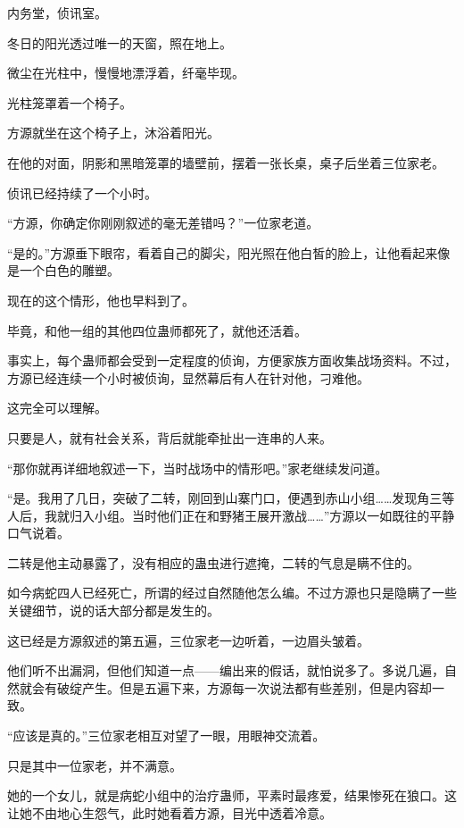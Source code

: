 
\begin{this_body}



内务堂，侦讯室。

冬日的阳光透过唯一的天窗，照在地上。

微尘在光柱中，慢慢地漂浮着，纤毫毕现。

光柱笼罩着一个椅子。

方源就坐在这个椅子上，沐浴着阳光。

在他的对面，阴影和黑暗笼罩的墙壁前，摆着一张长桌，桌子后坐着三位家老。

侦讯已经持续了一个小时。

“方源，你确定你刚刚叙述的毫无差错吗？”一位家老道。

“是的。”方源垂下眼帘，看着自己的脚尖，阳光照在他白皙的脸上，让他看起来像是一个白色的雕塑。

现在的这个情形，他也早料到了。

毕竟，和他一组的其他四位蛊师都死了，就他还活着。

事实上，每个蛊师都会受到一定程度的侦询，方便家族方面收集战场资料。不过，方源已经连续一个小时被侦询，显然幕后有人在针对他，刁难他。

这完全可以理解。

只要是人，就有社会关系，背后就能牵扯出一连串的人来。

“那你就再详细地叙述一下，当时战场中的情形吧。”家老继续发问道。

“是。我用了几日，突破了二转，刚回到山寨门口，便遇到赤山小组……发现角三等人后，我就归入小组。当时他们正在和野猪王展开激战……”方源以一如既往的平静口气说着。

二转是他主动暴露了，没有相应的蛊虫进行遮掩，二转的气息是瞒不住的。

如今病蛇四人已经死亡，所谓的经过自然随他怎么编。不过方源也只是隐瞒了一些关键细节，说的话大部分都是发生的。

这已经是方源叙述的第五遍，三位家老一边听着，一边眉头皱着。

他们听不出漏洞，但他们知道一点——编出来的假话，就怕说多了。多说几遍，自然就会有破绽产生。但是五遍下来，方源每一次说法都有些差别，但是内容却一致。

“应该是真的。”三位家老相互对望了一眼，用眼神交流着。

只是其中一位家老，并不满意。

她的一个女儿，就是病蛇小组中的治疗蛊师，平素时最疼爱，结果惨死在狼口。这让她不由地心生怨气，此时她看着方源，目光中透着冷意。


\end{this_body}
